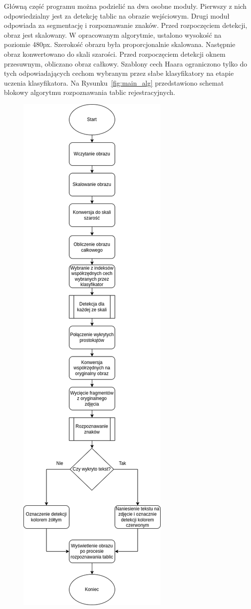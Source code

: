 Główną część programu można podzielić na dwa osobne moduły.
Pierwszy z nich odpowiedzialny jest za detekcję tablic na obrazie wejściowym.
Drugi moduł odpowiada za segmentację i rozpoznawanie znaków.
Przed rozpoczęciem detekcji, obraz jest skalowany.
W opracowanym algorytmie, ustalono wysokość na poziomie 480px.
Szerokość obrazu była proporcjonalnie skalowana.
Następnie obraz konwertowano do skali szarości.
Przed rozpoczęciem detekcji oknem przesuwnym, obliczano obraz całkowy.
Szablony cech Haara ograniczono tylko do tych odpowiadających cechom wybranym przez słabe klasyfikatory na etapie uczenia klasyfikatora.
Na Rysunku~\ref{fig:main_alg} przedstawiono schemat blokowy algorytmu rozpoznawania tablic rejestracyjnych.
\begin{figure}[!ht]
    \centering
    \includegraphics[scale=0.4]{Pictures/main_alg}

\end{figure}
